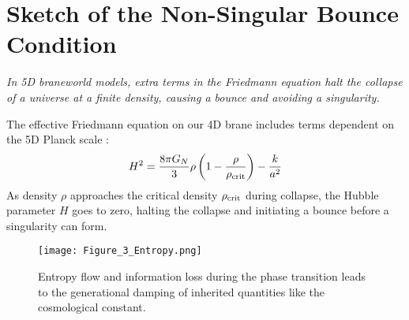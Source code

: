 \documentclass[aps,prd,onecolumn,10pt,superscriptaddress,nofootinbib,floatfix]{revtex4-2}
\begin{document}
\section{Sketch of the Non-Singular Bounce Condition}
\textit{In 5D braneworld models, extra terms in the Friedmann equation halt the collapse of a universe at a finite density, causing a bounce and avoiding a singularity.}

The effective Friedmann equation on our 4D brane includes terms dependent on the 5D Planck scale \cite{Garriga2000}:
\begin{equation}
H^2 = \frac{8\pi G_N}{3}\rho \left(1 - \frac{\rho}{\rho_{\rm crit}}\right) - \frac{k}{a^2}
\end{equation}
As density $\rho$ approaches the critical density $\rho_{\rm crit}$ during collapse, the Hubble parameter $H$ goes to zero, halting the collapse and initiating a bounce before a singularity can form.

\begin{figure}[H]
  \centering
  \texttt{[image: Figure\_3\_Entropy.png]}
  \caption{Entropy flow and information loss during the phase transition leads to the generational damping of inherited quantities like the cosmological constant.}
  \label{fig:entropy}
\end{figure}
\end{document}
